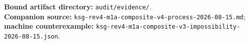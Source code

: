 \documentclass[11pt,a4paper]{article}
\begin{document}
\enlargethispage{3\baselineskip}
\begingroup
\footnotesize
\setlength{\parskip}{0pt}
\textbf{Bound artifact directory:} \nolinkurl{audit/evidence/}.\\
\textbf{Companion source:} \nolinkurl{ksg-rev4-m1a-composite-v4-process-2026-08-15.md};
\textbf{machine counterexample:}
\nolinkurl{ksg-rev4-m1a-composite-v3-impossibility-2026-08-15.json}.
\endgroup
\end{document}
